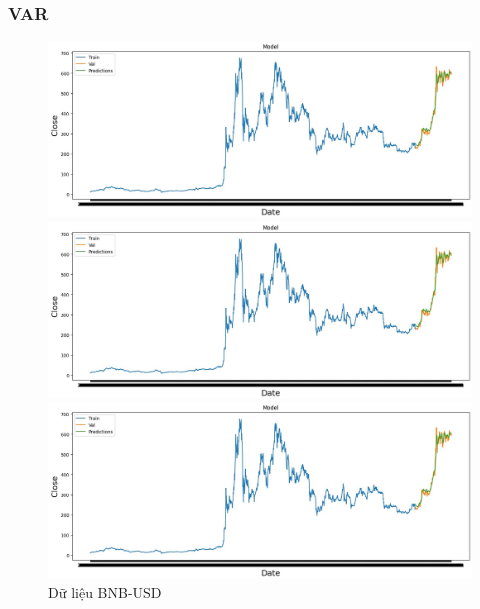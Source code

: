 \documentclass[conference]{IEEEtran}
\begin{document}
	\subsubsection{VAR}
	\begin{figure}[H]
		\centering
		\begin{minipage}{0.15\textwidth}
			\centering
			\includegraphics[width=1\textwidth]{Figure/BNB_LSTM.jpg}
		\end{minipage}
		\hfill
		\begin{minipage}{0.15\textwidth}
			\centering
			\includegraphics[width=1\textwidth]{Figure/BNB_LSTM.jpg}
		\end{minipage}
		\hfill
		\begin{minipage}{0.15\textwidth}
			\centering
			\includegraphics[width=1\textwidth]{Figure/BNB_LSTM.jpg}
		\end{minipage}
		\caption{Dữ liệu BNB-USD}
		\label{fig:1}
	\end{figure}
	
\end{document}
